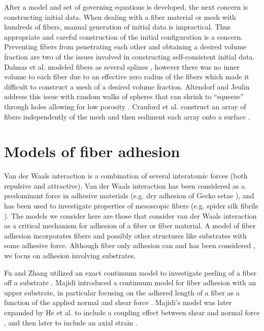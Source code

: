 After a model and set of governing equations is developed, the next concern is constructing initial data.
When dealing with a fiber material or mesh with hundreds of fibers, manual generation of initial data is impractical.
Thus appropriate and careful construction of the initial configuration is a concern.
Preventing fibers from penetrating each other and obtaining a desired volume fraction are two of the issues involved in constructing self-consistent initial data.
Dalmas et al. modeled fibers as several splines \cite{Dalmas2006}, however there was no inner volume to each fiber due to an effective zero radius of the fibers which made it difficult to construct a mesh of a desired volume fraction.
Altendorf and Jeulin address this issue with random walks of spheres that can shrink to ``squeeze'' through holes allowing for low porosity \cite{Altendorf2011}.
Cranford et al. construct an array of fibers independently of the mesh and then sediment each array onto a surface \cite{Cranford2010}.

\section{Models of fiber adhesion}

Van der Waals interaction is a combination of several interatomic forces (both repulsive and attractive).
Van der Waals interaction has been considered as a predominant force in adhesive materials (e.g. dry adhesion of Gecko setae \cite{Autumn2002}), and has been used to investigate properties of mesoscopic fibers (e.g. spider silk fibrils \cite{Cranford2013}).
The models we consider here are those that consider van der Waals interaction as a critical mechanism for adhesion of a fiber or fiber material.
A model of fiber adhesion incorporates fibers and possibly other structures like substrates with some adhesive force.
Although fiber only adhesion can and has been considered \cite{Li2011}, we focus on adhesion involving substrates. 
	
	Fu and Zhang utilized an exact continuum model to investigate peeling of a fiber off a substrate \cite{fu2011}. Majidi introduced a continuum model for fiber adhesion with an upper substrate, in particular focusing on the adhered length of a fiber as a function of the applied normal and shear force \cite{Majidi2009}. Majidi's model was later expanded by He et al. to include a coupling effect between shear and normal force \cite{He2012}, and then later to include an axial strain \cite{He2013}. 
	
